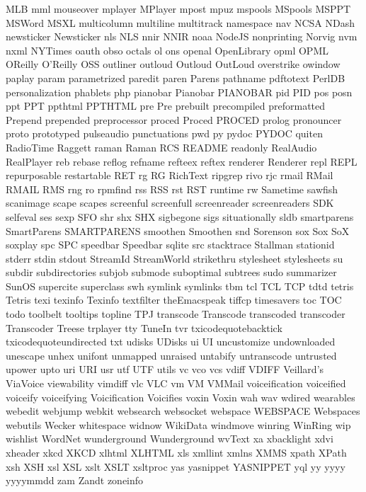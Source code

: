 MLB
mml
mouseover
mplayer
MPlayer
mpost
mpuz
mspools
MSpools
MSPPT
MSWord
MSXL
multicolumn
multiline
multitrack
namespace
nav
NCSA
NDash
newsticker
Newsticker
nls
NLS
nnir
NNIR
noaa
NodeJS
nonprinting
Norvig
nvm
nxml
NYTimes
oauth
obso
octals
ol
ons
openal
OpenLibrary
opml
OPML
OReilly
O'Reilly
OSS
outliner
outloud
Outloud
OutLoud
overstrike
owindow
paplay
param
parametrized
paredit
paren
Parens
pathname
pdftotext
PerlDB
personalization
phablets
php
pianobar
Pianobar
PIANOBAR
pid
PID
pos
posn
ppt
PPT
ppthtml
PPTHTML
pre
Pre
prebuilt
precompiled
preformatted
Prepend
prepended
preprocessor
proced
Proced
PROCED
prolog
pronouncer
proto
prototyped
pulseaudio
punctuations
pwd
py
pydoc
PYDOC
quiten
RadioTime
Raggett
raman
Raman
RCS
README
readonly
RealAudio
RealPlayer
reb
rebase
reflog
refname
refteex
reftex
renderer
Renderer
repl
REPL
repurposable
restartable
RET
rg
RG
RichText
ripgrep
rivo
rjc
rmail
RMail
RMAIL
RMS
rng
ro
rpmfind
rss
RSS
rst
RST
runtime
rw
Sametime
sawfish
scanimage
scape
scapes
screenful
screenfull
screenreader
screenreaders
SDK
selfeval
ses
sexp
SFO
shr
shx
SHX
sigbegone
sigs
situationally
sldb
smartparens
SmartParens
SMARTPARENS
smoothen
Smoothen
snd
Sorenson
sox
Sox
SoX
soxplay
spc
SPC
speedbar
Speedbar
sqlite
src
stacktrace
Stallman
stationid
stderr
stdin
stdout
StreamId
StreamWorld
strikethru
stylesheet
stylesheets
su
subdir
subdirectories
subjob
submode
suboptimal
subtrees
sudo
summarizer
SunOS
supercite
superclass
swh
symlink
symlinks
tbm
tcl
TCL
TCP
tdtd
tetris
Tetris
texi
texinfo
Texinfo
textfilter
theEmacspeak
tiffcp
timesavers
toc
TOC
todo
toolbelt
tooltips
topline
TPJ
transcode
Transcode
transcoded
transcoder
Transcoder
Treese
trplayer
tty
TuneIn
tvr
txicodequotebacktick
txicodequoteundirected
txt
udisks
UDisks
ui
UI
uncustomize
undownloaded
unescape
unhex
unifont
unmapped
unraised
untabify
untranscode
untrusted
upower
upto
uri
URI
usr
utf
UTF
utils
vc
vco
vcs
vdiff
VDIFF
Veillard's
ViaVoice
viewability
vimdiff
vlc
VLC
vm
VM
VMMail
voiceification
voiceified
voiceify
voiceifying
Voicification
Voicifies
voxin
Voxin
wah
wav
wdired
wearables
webedit
webjump
webkit
websearch
websocket
webspace
WEBSPACE
Webspaces
webutils
Wecker
whitespace
widnow
WikiData
windmove
winring
WinRing
wip
wishlist
WordNet
wunderground
Wunderground
wvText
xa
xbacklight
xdvi
xheader
xkcd
XKCD
xlhtml
XLHTML
xls
xmllint
xmlns
XMMS
xpath
XPath
xsh
XSH
xsl
XSL
xslt
XSLT
xsltproc
yas
yasnippet
YASNIPPET
yql
yy
yyyy
yyyymmdd
zam
Zandt
zoneinfo
